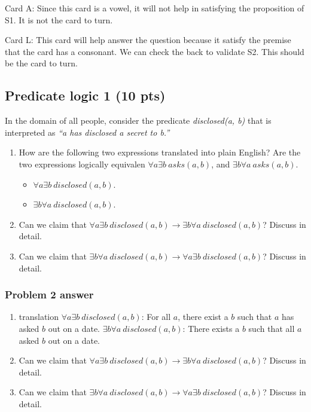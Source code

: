 \documentclass[12pt]{article}
\begin{document}
\noindent Card A: Since this card is a vowel, it will not help in satisfying the proposition of S1. It is not the card to turn.

\noindent Card L: This card will help answer the question because it satisfy the premise that the card has a consonant. We can check the back to validate S2. This should be the card to turn.

\newpage

\subsection{Predicate logic 1 (10 pts)}

In the domain of all people, consider the predicate \textit{disclosed(a, b)} that is interpreted as \textit{``a has disclosed a secret to  b.''}
\begin{enumerate}
\item How are the following two expressions translated into plain English? Are the two expressions logically equivalen $\forall a \exists b~asks(a, b)$, and $\exists b \forall a ~asks(a, b)$.
\begin{itemize}
	\item $\forall a \exists b~disclosed(a, b)$.
	\item $\exists b \forall a ~disclosed(a, b)$.
\end{itemize} 
\item Can we claim that $\forall a \exists b~disclosed(a, b) \rightarrow \exists b \forall a ~disclosed(a, b)$? Discuss in detail.
\item Can we claim that $\exists b \forall a ~disclosed(a, b) \rightarrow \forall a \exists b~disclosed(a, b)$? Discuss in detail.
\end{enumerate}

\subsubsection{Problem 2 answer}
\begin{enumerate}
\item translation
	\subitem $\forall a \exists b~disclosed(a, b)$: For all $a$, there exist a $b$ such that $a$ has asked $b$ out on a date. 
	\subitem $\exists b \forall a ~disclosed(a, b)$: There exists a $b$ such that all $a$ asked $b$ out on a date.
\item Can we claim that $\forall a \exists b~disclosed(a, b) \rightarrow \exists b \forall a ~disclosed(a, b)$? Discuss in detail.
	\subitem  
\item Can we claim that $\exists b \forall a ~disclosed(a, b) \rightarrow \forall a \exists b~disclosed(a, b)$? Discuss in detail.
\end{enumerate} 
\end{document}
